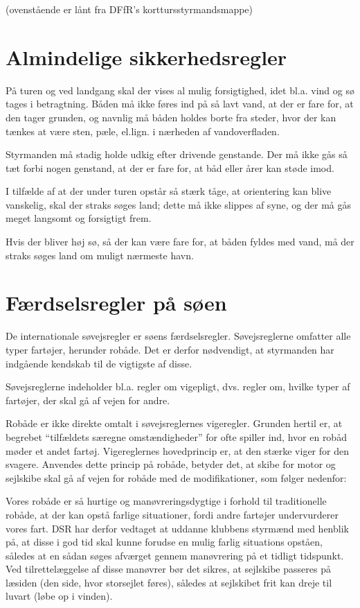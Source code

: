 \documentclass{article}
\begin{document}
(ovenstående er lånt fra DFfR's korttursstyrmandsmappe)

\section{Almindelige sikkerhedsregler}

På turen og ved landgang skal der vises al mulig forsigtighed, idet bl.a.
vind og sø tages i betragtning. Båden må ikke føres ind på så lavt vand,
at der er fare for, at den tager grunden, og navnlig må båden holdes
borte fra steder, hvor der kan tænkes at være sten, pæle, el.lign. i
nærheden af vandoverfladen.

Styrmanden må stadig holde udkig efter drivende genstande. Der må ikke
gås så tæt forbi nogen genstand, at der er fare for, at båd eller årer
kan støde imod.

I tilfælde af at der under turen opstår så stærk tåge, at orientering kan
blive vanskelig, skal der straks søges land; dette må ikke slippes af
syne, og der må gås meget langsomt og forsigtigt frem.

Hvis der bliver høj sø, så der kan være fare for, at båden fyldes med
vand, må der straks søges land om muligt nærmeste havn.

\section{Færdselsregler på søen}

De internationale søvejsregler er søens færdselsregler. Søvejsreglerne
omfatter alle typer fartøjer, herunder robåde. Det er derfor nødvendigt,
at styrmanden har indgående kendskab til de vigtigste af disse.

Søvejsreglerne indeholder bl.a. regler om vigepligt, dvs. regler om,
hvilke typer af fartøjer, der skal gå af vejen for andre.

Robåde er ikke direkte omtalt i søvejsreglernes vigeregler. Grunden
hertil er, at begrebet ``tilfældets særegne omstændigheder'' for ofte
spiller ind, hvor en robåd møder et andet fartøj. Vigereglernes
hovedprincip er, at den stærke viger for den svagere. Anvendes dette
princip på robåde, betyder det, at skibe for motor og sejlskibe skal gå
af vejen for robåde med de modifikationer, som følger nedenfor:

Vores robåde er så hurtige og manøvreringsdygtige i forhold til
traditionelle robåde, at der kan opstå farlige situationer, fordi andre
fartøjer undervurderer vores fart. DSR har derfor vedtaget at uddanne
klubbens styrmænd med henblik på, at disse i god tid skal kunne forudse
en mulig farlig situations opståen, således at en sådan søges afværget
gennem manøvrering på et tidligt tidspunkt. Ved tilrettelæggelse af disse
manøvrer bør det sikres, at sejlskibe passeres på læsiden (den side, hvor
storsejlet føres), således at sejlskibet frit kan dreje til luvart (løbe
op i vinden).
\end{document}
